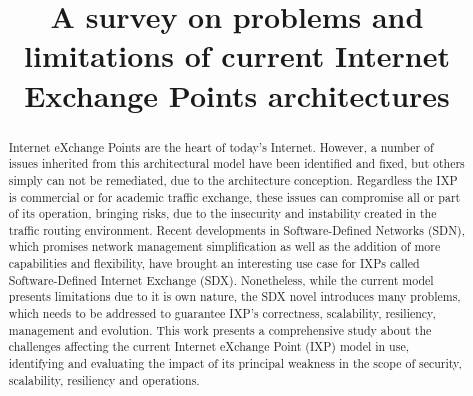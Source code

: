 \documentclass[conference]{IEEEtran/IEEEtran}
\begin{document}
\title{A survey on problems and limitations of current Internet Exchange Points architectures}

\author{
}


\maketitle

\begin{abstract}
Internet eXchange Points are the heart of today's Internet. However, a number of issues inherited from this architectural model have been identified and fixed, but others simply can not be remediated, due to the architecture conception. Regardless the IXP is commercial or for academic traffic exchange, these issues can compromise all or part of its operation, bringing risks, due to the insecurity and instability created in the traffic routing environment. Recent developments in Software-Defined Networks (SDN), which promises network management simplification as well as the addition of more capabilities and flexibility, have brought an interesting use case for IXPs called Software-Defined Internet Exchange (SDX). Nonetheless, while the current model presents limitations due to it is own nature, the SDX novel introduces many problems, which needs to be addressed to guarantee IXP's correctness, scalability, resiliency, management and evolution. This work presents a comprehensive study about the challenges affecting the current Internet eXchange Point (IXP) model in use, identifying and evaluating the impact of its principal weakness in the scope of security, scalability, resiliency and operations. 
\end{abstract}

%
\IEEEpeerreviewmaketitle
\end{document}
